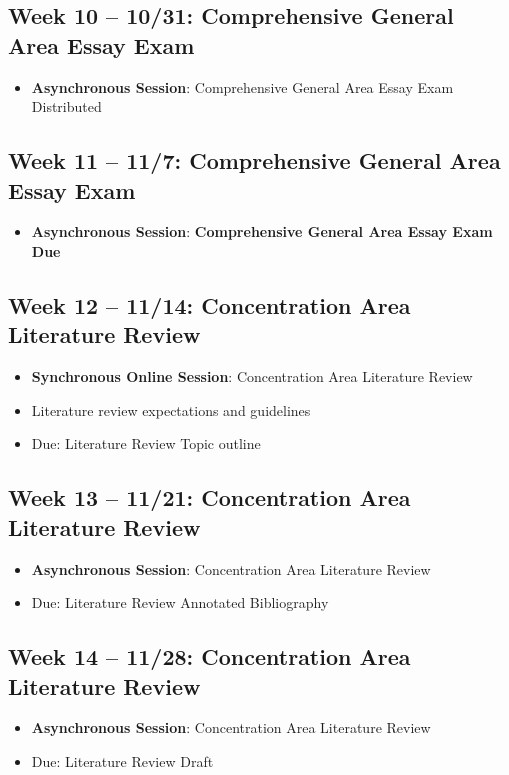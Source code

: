 \documentclass[12pt, letterpaper]{article}
\begin{document}
\subsection*{Week 10 -- 10/31: Comprehensive General Area Essay Exam}
\begin{itemize}
    \item \textbf{Asynchronous Session}: Comprehensive General Area Essay Exam Distributed
\end{itemize}   

\subsection*{Week 11 -- 11/7: Comprehensive General Area Essay Exam}
\begin{itemize}
    \item \textbf{Asynchronous Session}: \textbf{Comprehensive General Area Essay Exam Due}
\end{itemize}

\subsection*{Week 12 -- 11/14: Concentration Area Literature Review}
\begin{itemize}
    \item \textbf{Synchronous Online Session}: Concentration Area Literature Review
    \item Literature review expectations and guidelines
    \item Due: Literature Review Topic outline
\end{itemize}

\subsection*{Week 13 -- 11/21: Concentration Area Literature Review}
\begin{itemize}
    \item \textbf{Asynchronous Session}: Concentration Area Literature Review
    \item Due: Literature Review Annotated Bibliography
\end{itemize}

\subsection*{Week 14 -- 11/28: Concentration Area Literature Review}
\begin{itemize}
    \item \textbf{Asynchronous Session}: Concentration Area Literature Review
    \item Due: Literature Review Draft
\end{itemize}
\end{document}
